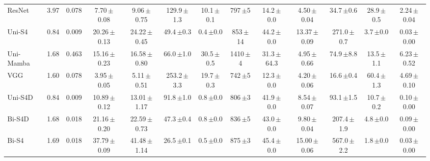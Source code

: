 \documentclass[sigconf,nonacm]{acmart}
\begin{document}
\begin{table}[t]
{\begin{tabular}{lcccccccccccc}
    ResNet & 3.97 & 0.078
      & 7.70{\scriptsize\,$\pm$0.08} & 9.06{\scriptsize\,$\pm$0.75} & 129.9{\scriptsize\,$\pm$1.3} & 10.1{\scriptsize\,$\pm$0.1}
      & 797{\scriptsize\,$\pm$5} & 14.2{\scriptsize\,$\pm$0.0} & 4.50{\scriptsize\,$\pm$0.04}
      & 34.7{\scriptsize\,$\pm$0.6} & 28.9{\scriptsize\,$\pm$0.5} & 2.24{\scriptsize\,$\pm$0.04} \\
    Uni-S4 & 0.84 & 0.009
      & 20.26{\scriptsize\,$\pm$0.13} & 24.22{\scriptsize\,$\pm$0.45} & 49.4{\scriptsize\,$\pm$0.3} & 0.4{\scriptsize\,$\pm$0.0}
      & 853{\scriptsize\,$\pm$14} & 44.2{\scriptsize\,$\pm$0.0} & 13.37{\scriptsize\,$\pm$0.09}
      & 271.0{\scriptsize\,$\pm$0.7} & 3.7{\scriptsize\,$\pm$0.0} & 0.03{\scriptsize\,$\pm$0.00} \\
    Uni-Mamba & 1.68 & 0.463
      & 15.16{\scriptsize\,$\pm$0.23} & 16.58{\scriptsize\,$\pm$0.80} & 66.0{\scriptsize\,$\pm$1.0} & 30.5{\scriptsize\,$\pm$0.5}
      & 1410{\scriptsize\,$\pm$4} & 31.3{\scriptsize\,$\pm$64.3} & 4.95{\scriptsize\,$\pm$0.66}
      & 74.9{\scriptsize\,$\pm$8.8} & 13.5{\scriptsize\,$\pm$1.1} & 6.23{\scriptsize\,$\pm$0.52} \\
    VGG & 1.60 & 0.078
      & 3.95{\scriptsize\,$\pm$0.05} & 5.11{\scriptsize\,$\pm$0.51} & 253.2{\scriptsize\,$\pm$3.3} & 19.7{\scriptsize\,$\pm$0.3}
      & 742{\scriptsize\,$\pm$5} & 12.3{\scriptsize\,$\pm$0.0} & 4.20{\scriptsize\,$\pm$0.06}
      & 16.6{\scriptsize\,$\pm$0.4} & 60.4{\scriptsize\,$\pm$1.3} & 4.69{\scriptsize\,$\pm$0.10} \\
    Uni-S4D & 0.84 & 0.009
      & 10.89{\scriptsize\,$\pm$0.12} & 13.01{\scriptsize\,$\pm$1.17} & 91.8{\scriptsize\,$\pm$1.0} & 0.8{\scriptsize\,$\pm$0.0}
      & 806{\scriptsize\,$\pm$3} & 41.9{\scriptsize\,$\pm$0.0} & 8.54{\scriptsize\,$\pm$0.07}
      & 93.1{\scriptsize\,$\pm$1.5} & 10.7{\scriptsize\,$\pm$0.2} & 0.10{\scriptsize\,$\pm$0.00} \\
    Bi-S4D & 1.68 & 0.018
      & 21.16{\scriptsize\,$\pm$0.20} & 22.59{\scriptsize\,$\pm$0.73} & 47.3{\scriptsize\,$\pm$0.4} & 0.8{\scriptsize\,$\pm$0.0}
      & 836{\scriptsize\,$\pm$5} & 43.0{\scriptsize\,$\pm$0.0} & 9.80{\scriptsize\,$\pm$0.04}
      & 207.4{\scriptsize\,$\pm$1.9} & 4.8{\scriptsize\,$\pm$0.0} & 0.09{\scriptsize\,$\pm$0.00} \\
    Bi-S4 & 1.69 & 0.018
      & 37.79{\scriptsize\,$\pm$0.09} & 41.48{\scriptsize\,$\pm$1.14} & 26.5{\scriptsize\,$\pm$0.1} & 0.5{\scriptsize\,$\pm$0.0}
      & 875{\scriptsize\,$\pm$3} & 45.4{\scriptsize\,$\pm$0.0} & 15.00{\scriptsize\,$\pm$0.06}
      & 567.0{\scriptsize\,$\pm$2.2} & 1.8{\scriptsize\,$\pm$0.0} & 0.03{\scriptsize\,$\pm$0.00} \\

\end{tabular}}
\end{table}
\end{document}
